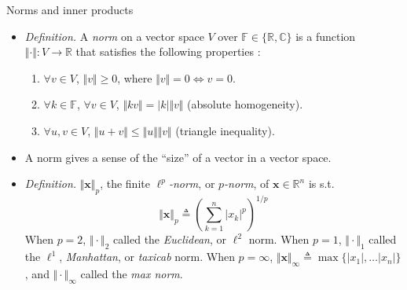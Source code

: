 \documentclass{beamer}
\numberwithin{equation}{section}
\begin{document}
\begin{frame}{Norms and inner products}
    \begin{itemize}
        \item
        \textit{Definition.} A \textit{norm} on a vector space $ V $ over
        $ \mathbb{F} \in \{\mathbb{R}, \mathbb{C}\} $ is a function
        $ \Vert\cdot\Vert : V \rightarrow \mathbb{R} $ that satisfies the
        following properties \cite{jacob_linalg}:
        \begin{enumerate}
            \item
            $ \forall v \in V $, $ \Vert v\Vert \ge 0 $, where
            $ \Vert v\Vert = 0 \Leftrightarrow v = 0 $.

            \item
            $ \forall k \in \mathbb{F} $, $ \forall v \in V $,
            $ \Vert kv\Vert = |k|\Vert v\Vert $ (absolute homogeneity).

            \item
            $ \forall u, v \in V $, $ \Vert u + v\Vert \le
            \Vert u\Vert\Vert v\Vert $ (triangle inequality).
        \end{enumerate}

        \item
        A norm gives a sense of the ``size'' of a vector in a vector space.

        \item
        \textit{Definition.} $ \Vert\mathbf{x}\Vert_p $, the finite
        $ \ell^p $\textit{-norm}, or $ p $\textit{-norm}, of
        $ \mathbf{x} \in \mathbb{R}^n $ is s.t.
        \begin{equation*}
            \Vert\mathbf{x}\Vert_p \triangleq
            \left(\sum_{k = 1}^n|x_k|^p\right)^{1 / p}
        \end{equation*}
        When $ p = 2 $, $ \Vert\cdot\Vert_2 $ called the \textit{Euclidean},
        or $ \ell^2 $ norm. When $ p = 1 $, $ \Vert\cdot\Vert_1 $ called the
        $ \ell^1 $, \textit{Manhattan}, or \textit{taxicab} norm. When
        $ p = \infty $, $ \Vert\mathbf{x}\Vert_\infty \triangleq
        \max\{|x_1|, \ldots |x_n|\} $, and $ \Vert\cdot\Vert_\infty $ called
        the \textit{max norm}.
    \end{itemize}
\end{frame}
\end{document}
